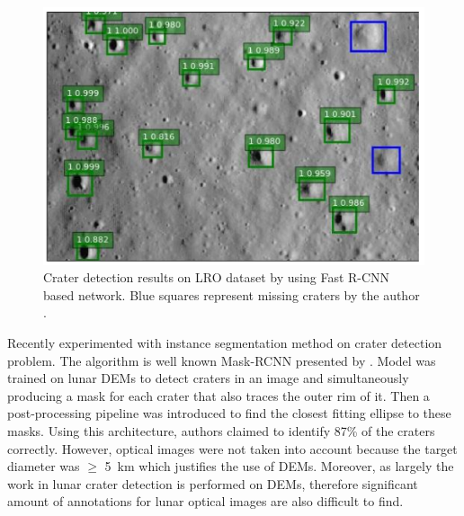 \documentclass[11pt]{article}
\begin{document}
\begin{figure}[H]
	\centering
	\includegraphics[width=.6\linewidth]{files/literature/fastrcnn.png}
	\caption{Crater detection results on LRO dataset by using Fast R-CNN based network. Blue squares represent missing craters by the author \cite{emami2015automatic}.}
	\label{dem}
\end{figure}

Recently \cite{ali2019automated} experimented with instance segmentation method on crater detection problem. The algorithm is well known Mask-RCNN presented by \cite{he2017mask}. Model was trained on lunar DEMs to detect craters in an image and simultaneously producing a mask for each crater that also traces the outer rim of it. Then a post-processing pipeline was introduced to find the closest fitting ellipse to these masks. Using this architecture, authors claimed to identify 87\% of the craters correctly. However, optical images were not taken into account because the target diameter was $\geq$ \SI{5}{km} which justifies the use of DEMs. Moreover, as largely the work in lunar crater detection is performed on DEMs, therefore significant amount of annotations for lunar optical images are also difficult to find. 

\end{document}
